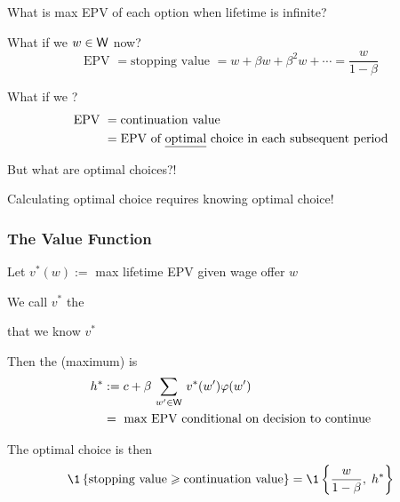 \begin{frame}
    
    What is max EPV of each option when lifetime is infinite?  

    What if we  $w \in \mathsf W$ now?
    \begin{equation*}
        \text{EPV }
        = \text{stopping value }
        = w + \beta w + \beta^2 w + \cdots 
        = \frac{w}{1 - \beta}
    \end{equation*}

    What if we ?
    \begin{align*}
        \text{EPV }
        & = \text{continuation value }
        \\
        & = \text{EPV of \underline{optimal} choice in each subsequent period}
    \end{align*}

    But what are optimal choices?!

    Calculating optimal choice requires knowing optimal choice!

\end{frame}

\begin{frame}
    \frametitle{The Value Function}

    Let  $v^*(w) :=$ max lifetime EPV given wage offer $w$
    \vspace{0.4em}

    We call $v^*$ the 

    \vspace{0.4em}
     that we know $v^*$

    \vspace{0.4em}
    Then the (maximum)  is 
    \begin{align*}
        h^* 
        & := c + \beta \, \sum_{w' \in \mathsf W} \, v^*(w') \varphi(w') 
        \\
        & = \text{ max EPV conditional on decision to continue}
    \end{align*}

    The optimal choice is then
    \begin{equation*}
         \1
        \left\{
            \text{stopping value} \geq \text{continuation value}
        \right\}
         = \1
        \left\{
            \frac{w}{1 - \beta}, \; h^*
        \right\}
    \end{equation*}


\end{frame}


